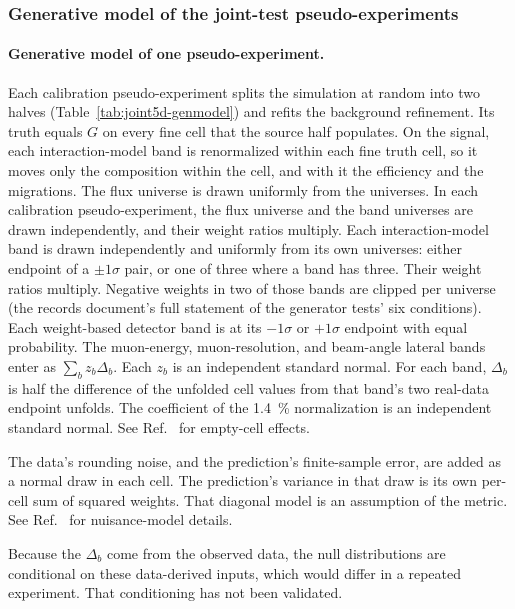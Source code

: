 \subsubsection{Generative model of the joint-test pseudo-experiments}
\label{app:joint5d-genmodel}
\paragraph{Generative model of one pseudo-experiment.} Each calibration pseudo-experiment splits the simulation at random into two halves (Table~\ref{tab:joint5d-genmodel}) and refits the background refinement. Its truth equals $G$ on every fine cell that the source half populates. On the signal, each interaction-model band is renormalized within each fine truth cell, so it moves only the composition within the cell, and with it the efficiency and the migrations. The flux universe is drawn uniformly from the \jtFluxUniverses{} universes. In each calibration pseudo-experiment, the flux universe and the band universes are drawn independently, and their weight ratios multiply. Each interaction-model band is drawn independently and uniformly from its own universes: either endpoint of a $\pm1\sigma$ pair, or one of three where a band has three. Their weight ratios multiply. Negative weights in two of those bands are clipped per universe (the records document's full statement of the generator tests' six conditions). Each weight-based detector band is at its $-1\sigma$ or $+1\sigma$ endpoint with equal probability. The muon-energy, muon-resolution, and beam-angle lateral bands enter as $\sum_{b}z_{b}\Delta_{b}$. Each $z_{b}$ is an independent standard normal. For each band, $\Delta_{b}$ is half the difference of the unfolded cell values from that band's two real-data endpoint unfolds. The coefficient of the \SI{1.4}{\percent} normalization is an independent standard normal. See Ref.~\cite{NoteRecords2026} for empty-cell effects.

The data's rounding noise, and the prediction's finite-sample error, are added as a normal draw in each cell. The prediction's variance in that draw is its own per-cell sum of squared weights. That diagonal model is an assumption of the metric. See Ref.~\cite{NoteRecords2026} for nuisance-model details.

Because the $\Delta_{b}$ come from the observed data, the null distributions are conditional on these data-derived inputs, which would differ in a repeated experiment. That conditioning has not been validated.

